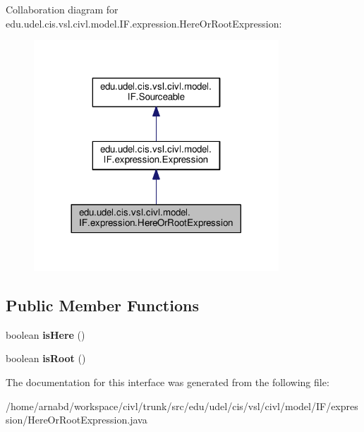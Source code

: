 Collaboration diagram for edu.\+udel.\+cis.\+vsl.\+civl.\+model.\+I\+F.\+expression.\+Here\+Or\+Root\+Expression\+:
\nopagebreak
\begin{figure}[H]
\begin{center}
\leavevmode
\includegraphics[width=260pt]{interfaceedu_1_1udel_1_1cis_1_1vsl_1_1civl_1_1model_1_1IF_1_1expression_1_1HereOrRootExpression__coll__graph}
\end{center}
\end{figure}
\subsection*{Public Member Functions}
\begin{DoxyCompactItemize}
\item 
\hypertarget{interfaceedu_1_1udel_1_1cis_1_1vsl_1_1civl_1_1model_1_1IF_1_1expression_1_1HereOrRootExpression_a98842f11a89e8e8544624e6b13a8cc1f}{}boolean {\bfseries is\+Here} ()\label{interfaceedu_1_1udel_1_1cis_1_1vsl_1_1civl_1_1model_1_1IF_1_1expression_1_1HereOrRootExpression_a98842f11a89e8e8544624e6b13a8cc1f}

\item 
\hypertarget{interfaceedu_1_1udel_1_1cis_1_1vsl_1_1civl_1_1model_1_1IF_1_1expression_1_1HereOrRootExpression_a77415f771d859f5728c1721ecc09d0f9}{}boolean {\bfseries is\+Root} ()\label{interfaceedu_1_1udel_1_1cis_1_1vsl_1_1civl_1_1model_1_1IF_1_1expression_1_1HereOrRootExpression_a77415f771d859f5728c1721ecc09d0f9}

\end{DoxyCompactItemize}


The documentation for this interface was generated from the following file\+:\begin{DoxyCompactItemize}
\item 
/home/arnabd/workspace/civl/trunk/src/edu/udel/cis/vsl/civl/model/\+I\+F/expression/Here\+Or\+Root\+Expression.\+java\end{DoxyCompactItemize}
